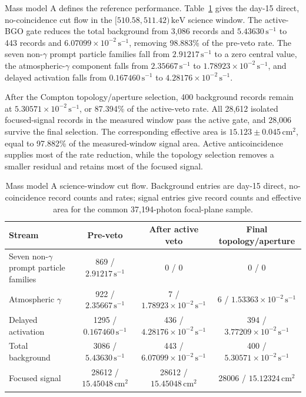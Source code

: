 \documentclass[11pt]{article}
\newcommand{\keV}{\ensuremath{\,\mathrm{keV}}}
\newcommand{\cps}{\ensuremath{\,\mathrm{s^{-1}}}}
\begin{document}
Mass model A defines the reference performance. Table~\ref{tab:phase2_cutflow} gives the day-15 direct, no-coincidence cut flow in the $[510.58,511.42)\keV$ science window. The active-BGO gate reduces the total background from 3,086 records and $5.43630\cps$ to 443 records and $6.07099\times10^{-2}\cps$, removing 98.883\% of the pre-veto rate. The seven non-$\gamma$ prompt particle families fall from $2.91217\cps$ to a zero central value, the atmospheric-$\gamma$ component falls from $2.35667\cps$ to $1.78923\times10^{-2}\cps$, and delayed activation falls from $0.167460\cps$ to $4.28176\times10^{-2}\cps$.

After the Compton topology/aperture selection, 400 background records remain at $5.30571\times10^{-2}\cps$, or 87.394\% of the active-veto rate. All 28,612 isolated focused-signal records in the measured window pass the active gate, and 28,006 survive the final selection. The corresponding effective area is $15.123\pm0.045\,\mathrm{cm^2}$, equal to 97.882\% of the measured-window signal area. Active anticoincidence supplies most of the rate reduction, while the topology selection removes a smaller residual and retains most of the focused signal.

\begin{table}[H]
\centering
\caption{Mass model A science-window cut flow. Background entries are day-15 direct, no-coincidence record counts and rates; signal entries give record counts and effective area for the common 37,194-photon focal-plane sample.}
\label{tab:phase2_cutflow}
\footnotesize
\begin{tabular}{lccc}
\toprule
Stream & Pre-veto & After active veto & Final topology/aperture \\
\midrule
Seven non-$\gamma$ prompt particle families & 869 / $2.91217\cps$ & 0 / 0 & 0 / 0 \\
Atmospheric $\gamma$ & 922 / $2.35667\cps$ & 7 / $1.78923\times10^{-2}\cps$ & 6 / $1.53363\times10^{-2}\cps$ \\
Delayed activation & 1295 / $0.167460\cps$ & 436 / $4.28176\times10^{-2}\cps$ & 394 / $3.77209\times10^{-2}\cps$ \\
Total background & 3086 / $5.43630\cps$ & 443 / $6.07099\times10^{-2}\cps$ & 400 / $5.30571\times10^{-2}\cps$ \\
Focused signal & 28612 / $15.45048\,\mathrm{cm^2}$ & 28612 / $15.45048\,\mathrm{cm^2}$ & 28006 / $15.12324\,\mathrm{cm^2}$ \\
\bottomrule
\end{tabular}
\end{table}
\end{document}
